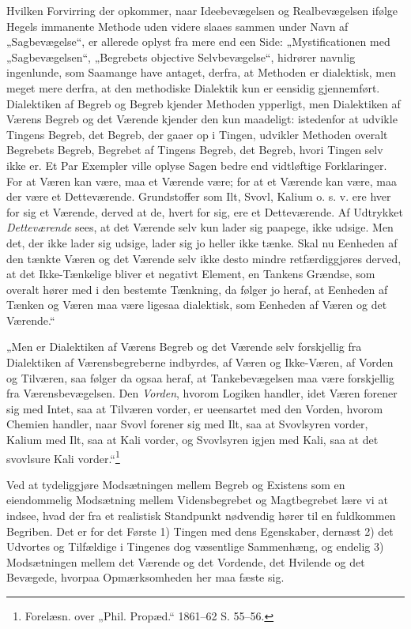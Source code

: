 \documentclass[11pt]{book}
\newcommand{\opage}[1]{\marginnote{\footnotesize\textit{[#1]}}}
\begin{document}
Hvilken Forvirring der opkommer, naar Ideebevægelsen og Realbevægelsen
ifølge Hegels immanente Methode uden videre slaaes sammen under Navn af
„Sagbevægelse“, er allerede oplyst fra mere end een Side:
„Mystificationen med „Sagbevægelsen“, „Begrebets objective
Selvbevægelse“, hidrører navnlig ingenlunde, som Saamange have antaget,
derfra, at Methoden er dialektisk, men meget mere derfra, at den
methodiske Dialektik kun er eensidig gjennemført. Dialektiken af Begreb
og Begreb kjender Methoden ypperligt, men Dialektiken af Værens Begreb
og det Værende kjender den kun maadeligt: istedenfor at udvikle Tingens
Begreb, det Begreb, der gaaer op i Tingen, udvikler Methoden overalt
Begrebets Begreb, Begrebet af Tingens Begreb, det Begreb, hvori Tingen
selv ikke er. Et Par Exempler ville oplyse Sagen bedre end vidtløftige
Forklaringer. For at Væren kan være, maa et Værende være; for at et
Værende kan være, maa der være et Detteværende. Grundstoffer som Ilt,
Svovl, Kalium o. s. v. ere hver for sig et Værende, derved at de, hvert
for sig, ere et Detteværende. Af Udtrykket \emph{Detteværende} sees,
at det Værende selv kun lader sig paapege, ikke udsige. Men det, der
ikke lader sig udsige, lader sig jo heller ikke tænke. Skal nu Eenheden
af den tænkte Væren og det Værende selv
\opage{201} \setcounter{footnote}{0}%
ikke desto mindre retfærdiggjøres derved, at det Ikke-Tænkelige bliver
et negativt Element, en Tankens Grændse, som overalt hører med i den
bestemte Tænkning, da følger jo heraf, at Eenheden af Tænken og Væren
maa være ligesaa dialektisk, som Eenheden af Væren og det Værende.“

„Men er Dialektiken af Værens Begreb og det Værende selv forskjellig
fra Dialektiken af Værensbegreberne indbyrdes, af Væren og Ikke-Væren,
af Vorden og Tilværen, saa følger da ogsaa heraf, at Tankebevægelsen
maa være forskjellig fra Værensbevægelsen. Den \emph{Vorden}, hvorom
Logiken handler, idet Væren forener sig med Intet, saa at Tilværen
vorder, er ueensartet med den Vorden, hvorom Chemien handler, naar
Svovl forener sig med Ilt, saa at Svovlsyren vorder, Kalium med Ilt,
saa at Kali vorder, og Svovlsyren igjen med Kali, saa at det svovlsure
Kali vorder.“\footnote{%
Forelæsn. over „Phil. Propæd.“ 1861--62 S. 55--56.}

Ved at tydeliggjøre Modsætningen mellem Begreb og Existens som en
eiendommelig Modsætning mellem Vidensbegrebet og Magtbegrebet lære vi
at indsee, hvad der fra et realistisk Standpunkt nødvendig hører til en
fuldkommen Begriben. Det er for det Første 1) Tingen med dens
Egenskaber, dernæst 2) det Udvortes og Tilfældige i Tingenes dog
væsentlige Sammenhæng, og endelig 3) Modsætningen mellem det Værende og
det Vordende, det Hvilende og det Bevægede, hvorpaa Opmærksomheden her
maa fæste sig.
\end{document}
